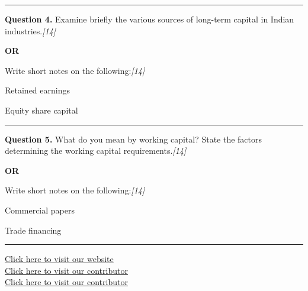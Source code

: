 \documentclass[11pt,a4paper]{article}
\newcommand{\pts}[1]{\hfill   \textit{[#1]}}
\begin{document}
\medskip\rule{\linewidth}{0.2pt}




\noindent   \textbf{Question 4.}
Examine briefly the various sources of long-term capital in Indian industries.\pts{14}

\centerline{   \textbf{OR}}

Write short notes on the following:\pts{14}

\begin{parts}
  \item Retained earnings
  \item Equity share capital
\end{parts}

\medskip\rule{\linewidth}{0.2pt}




\noindent   \textbf{Question 5.}
What do you mean by working capital? State the factors determining the working capital requirements.\pts{14}

\centerline{   \textbf{OR}}

Write short notes on the following:\pts{14}

\begin{parts}
  \item Commercial papers
  \item Trade financing
\end{parts}

\vfill
\rule{\linewidth}{0.4pt}

\begin{center}\small
\href{https://bhu-exam.vercel.app/}{Click here to visit our website}\\[4pt]
\href{https://me-aryan.vercel.app/}{Click here to visit our contributor}\\[4pt]
\href{https://quashan-me.vercel.app/}{Click here to visit our contributor}
\end{center}
\end{document}
